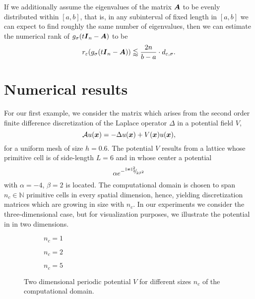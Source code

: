 \documentclass[12pt]{article}
\begin{document}
If we additionally assume the eigenvalues of the matrix $\boldsymbol{A}$ to be evenly distributed within $[a, b]$, that is, in any subinterval of fixed length in $[a, b]$ we can expect to find roughly the same number of eigenvalues, then we can estimate the numerical rank of $g_{\sigma}(t\boldsymbol{I}_n - \boldsymbol{A})$ to be
\begin{equation}
    r_{\varepsilon}(g_{\sigma}(t\boldsymbol{I}_n - \boldsymbol{A})) \lessapprox \frac{2 n}{b - a} \cdot d_{\varepsilon, \sigma}.
    \label{equ:gaussian-kernel-numerical-rank-uniform}
\end{equation}


\section{Numerical results}
\label{sec:results}

For our first example, we consider the matrix which arises from the second order
finite difference discretization of the Laplace operator $\Delta$ in a potential
field $V$,
\begin{equation}
    \mathcal{A} u(\boldsymbol{x}) = - \Delta u(\boldsymbol{x}) + V(\boldsymbol{x}) u(\boldsymbol{x}),
    \label{equ:5-experiments-electronic-hamiltonian}
\end{equation}
for a uniform mesh of size $h=0.6$. The potential $V$ results from a
lattice whose primitive cell is of side-length $L=6$ and in whose center a
potential
\begin{equation}
    \alpha e^{-{}^{\lVert \boldsymbol{x} \rVert _2^2}{\mskip -5mu/\mskip -3mu}_{ 2 \beta^2 }}
    \label{equ:5-experiments-gaussian-cell}
\end{equation}
with $\alpha = -4$, $\beta = 2$ is located. The computational domain is chosen
to span $n_c \in \mathbb{N}$ primitive cells in every spatial dimension, hence, yielding
discretization matrices which are growing in size with $n_c$. In our experiments
we consider the three-dimensional case, but for visualization purposes, we
illustrate the potential in 
in two dimensions.

\begin{figure}[ht]
    \begin{subfigure}[b]{0.32\columnwidth}
        
        \caption{$n_c=1$}
        \label{fig:gaussian-well-1}
    \end{subfigure}
    \begin{subfigure}[b]{0.32\columnwidth}
        
        \caption{$n_c=2$}
        \label{fig:gaussian-well-2}
    \end{subfigure}
    \begin{subfigure}[b]{0.32\columnwidth}
        
        \caption{$n_c=5$}
        \label{fig:gaussian-well-5}
    \end{subfigure}
    \caption{Two dimensional periodic potential $V$ for different sizes $n_c$ of the computational domain.}
    \label{fig:gaussian-well}
\end{figure}
\end{document}
